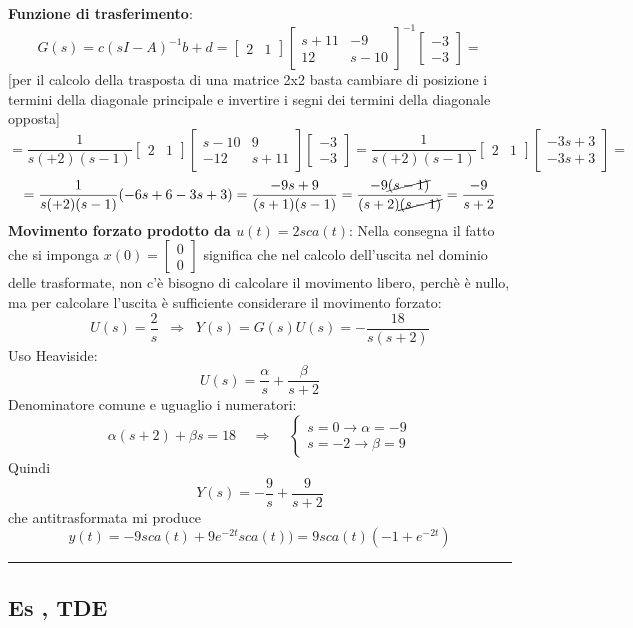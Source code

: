 \textbf{Funzione di trasferimento}:
\[
    G(s) = c(sI-A)^{-1} b +d = \left[\begin{matrix}
        2 &1
    \end{matrix}\right] \left[\begin{matrix}
        s+11 & -9 \\ 12 & s-10
    \end{matrix}\right]^{-1} \left[\begin{matrix}
        -3\\-3
    \end{matrix}\right] =
\]
[per il calcolo della trasposta di una matrice 2x2 basta cambiare di posizione i termini della diagonale principale e invertire i segni dei termini della diagonale opposta]
\[
    = \frac{1}{s(+2)(s-1)} \left[\begin{matrix}
        2 &1
    \end{matrix}\right] \left[\begin{matrix}
        s-10 & 9 \\ -12 & s+11
    \end{matrix}\right] \left[\begin{matrix}
        -3\\-3
    \end{matrix}\right] = \frac{1}{s(+2)(s-1)} \left[\begin{matrix}
        2 & 1
    \end{matrix}\right] \left[\begin{matrix}
        -3s+3\\-3s + 3
    \end{matrix}\right] =
\]
\[
    = \frac{1}{s(+2)(s-1)} (-6s + 6 -3s +3) = \frac{-9s +9}{(s+1)(s-1)} = \frac{-9 \cancel{(s-1)}}{(s+2)\cancel{(s-1)}} = \frac{-9}{s+2}
\]
\newline
\textbf{Movimento forzato prodotto da $u(t) = 2 sca(t)$}:\newline
Nella consegna il fatto che si imponga $x(0) = \left[\begin{matrix}
    0\\0
\end{matrix}\right]$ significa che nel calcolo dell'uscita nel dominio delle trasformate, non c'è bisogno di calcolare il movimento libero, perchè è nullo, ma per calcolare l'uscita è sufficiente considerare il movimento forzato:
\[
    U(s) = \frac{2}{s} \;\; \Rightarrow  \;\; Y(s) = G(s) U(s) = - \frac{18}{s(s+2)}
\]
Uso Heaviside:
\[
    U(s) = \frac{\alpha}{s} + \frac{\beta}{s+2}
\]
Denominatore comune e uguaglio i numeratori:
\[
    \alpha(s+2) + \beta s = 18 \;\;\;\; \Rightarrow \;\;\;\; \begin{cases}
        s= 0 \rightarrow \alpha = -9\\
        s = -2 \rightarrow  \beta = 9
    \end{cases}
\]
Quindi 
\[
    Y(s) = -\frac{9}{s} + \frac{9}{s+2}
\]
che antitrasformata mi produce
\[
    y(t) = - 9 sca(t) + 9 e^{-2t} sca(t)) = 9 sca(t) (-1 + e^{-2t})
\]
\rule{\textwidth}{0,4pt}
\subsection{Es , TDE }